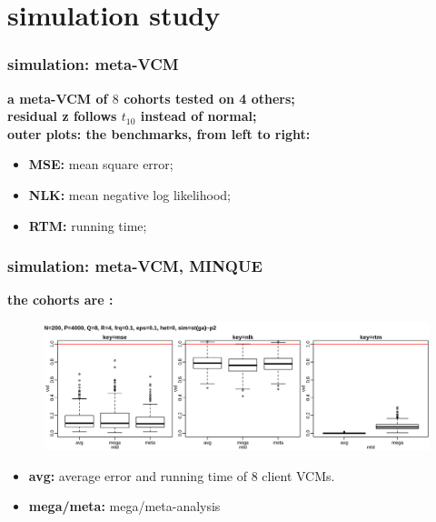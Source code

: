 \documentclass{beamer}
\begin{document}
\section{simulation study}
\begin{frame}\frametitle{simulation: meta-VCM}
  \textbf{a meta-VCM of $8$ cohorts tested on 4 others;} \\
  \textbf{residual z follows $t_{10}$ instead of normal;} \\
  {\color{blue}\textbf{outer plots: the benchmarks, from left to right:}}
  \begin{itemize}
  \item \textbf{MSE:} mean square error;
  \item \textbf{NLK:} mean negative log likelihood;
  \item \textbf{RTM:} running time;
  \end{itemize}
\end{frame}
\begin{frame} \frametitle{simulation: meta-VCM, MINQUE}
  \textbf{the cohorts are \color{blue}{homogeneous}:} \\
  \begin{figure}
    \centering \includegraphics[width=.95\linewidth]{img/met_hom_stt_mnq_ssz}
  \end{figure}
  \textbf{\color{blue}{inner plot: strategies, from left to right:}}
  \begin{itemize}
  \item \textbf{avg:} average error and running time of 8 client VCMs.
  \item \textbf{mega/meta:} mega/meta-analysis
  \end{itemize}
\end{frame}
\end{document}
